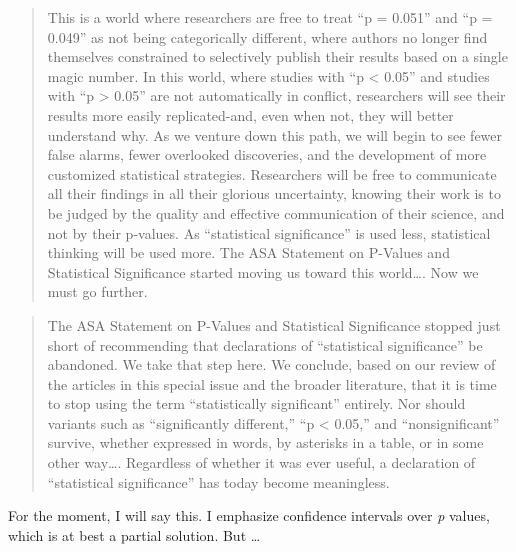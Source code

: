 \documentclass[
]{book}
\begin{document}
\begin{quote}
This is a world where researchers are free to treat ``p = 0.051'' and ``p = 0.049'' as not being categorically different, where authors no longer find themselves constrained to selectively publish their results based on a single magic number. In this world, where studies with ``p \textless{} 0.05'' and studies with ``p \textgreater{} 0.05'' are not automatically in conflict, researchers will see their results more easily replicated-and, even when not, they will better understand why. As we venture down this path, we will begin to see fewer false alarms, fewer overlooked discoveries, and the development of more customized statistical strategies. Researchers will be free to communicate all their findings in all their glorious uncertainty, knowing their work is to be judged by the quality and effective communication of their science, and not by their p-values. As ``statistical significance'' is used less, statistical thinking will be used more. The ASA Statement on P-Values and Statistical Significance started moving us toward this world\ldots. Now we must go further.
\end{quote}

\begin{quote}
The ASA Statement on P-Values and Statistical Significance stopped just short of recommending that declarations of ``statistical significance'' be abandoned. We take that step here. We conclude, based on our review of the articles in this special issue and the broader literature, that it is time to stop using the term ``statistically significant'' entirely. Nor should variants such as ``significantly different,'' ``p \textless{} 0.05,'' and ``nonsignificant'' survive, whether expressed in words, by asterisks in a table, or in some other way\ldots. Regardless of whether it was ever useful, a declaration of ``statistical significance'' has today become meaningless.
\end{quote}

For the moment, I will say this. I emphasize confidence intervals over \emph{p} values, which is at best a partial solution. But \ldots{}
\end{document}
